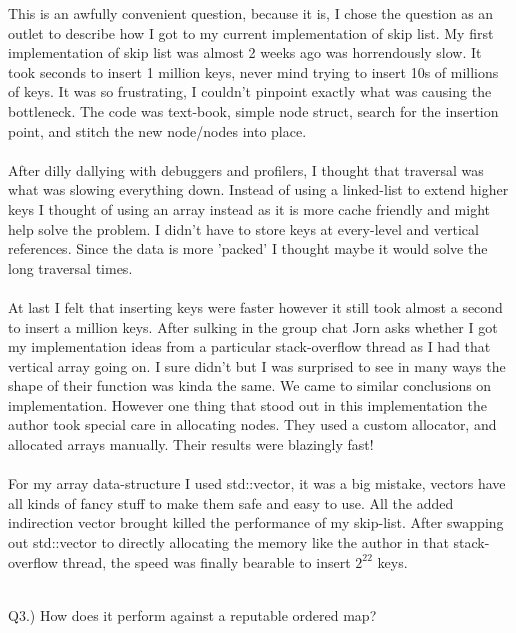 \documentclass[12pt]{article}
\begin{document}
This is an awfully convenient question, because it is, I chose the question as an outlet to describe how I got to my current implementation of skip list. My first implementation of skip list was almost 2 weeks ago was horrendously slow. It took seconds to insert 1 million keys, never mind trying to insert 10s of millions of keys. It was so frustrating, I couldn't pinpoint exactly what was causing the bottleneck. The code was text-book, simple node struct, search for the insertion point, and stitch the new node/nodes into place.
\\\\
After dilly dallying with debuggers and profilers, I thought that traversal was what was slowing everything down. Instead of using a linked-list to extend higher keys I thought of using an array instead as it is more cache friendly and might help solve the problem. I didn't have to store keys at every-level and vertical references. Since the data is more 'packed' I thought maybe it would solve the long traversal times.
\\\\
At last I felt that inserting keys were faster however it still took almost a second to insert a million keys. After sulking in the group chat Jorn asks whether I got my implementation ideas from a particular stack-overflow thread \cite{stack-overflow} as I had that vertical array going on. I sure didn't but I was surprised to see in many ways the shape of their function was kinda the same. We came to similar conclusions on implementation. However one thing that stood out in this implementation the author took special care in allocating nodes. They used a custom allocator, and allocated arrays manually. Their results were blazingly fast!
\\\\
For my array data-structure I used std::vector, it was a big mistake, vectors have all kinds of fancy stuff to make them safe and easy to use. All the added indirection vector brought killed the performance of my skip-list. After swapping out std::vector to directly allocating the memory  like the author in that stack-overflow thread, the speed was finally bearable to insert $2^{22}$ keys.
\\\\

\pagebreak

Q3.) How does it perform against a reputable ordered map?\\
\end{document}
